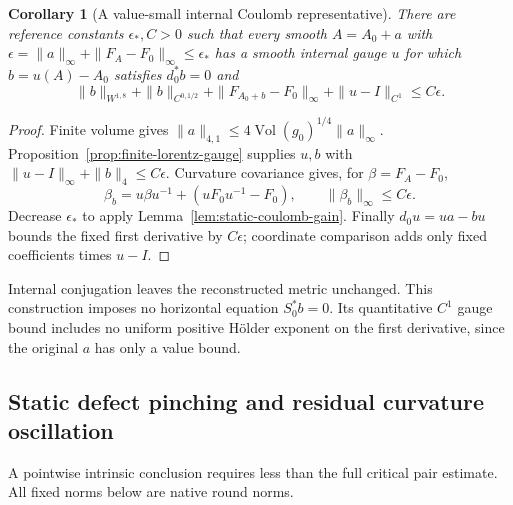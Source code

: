 \documentclass[11pt]{article}
\numberwithin{equation}{section}
\newtheorem{corollary}[theorem]{Corollary}
\theoremstyle{definition}
\theoremstyle{remark}
\begin{document}
\begin{corollary}[A value-small internal Coulomb representative]
\label{cor:value-coulomb-representative}
There are reference constants \(\epsilon_*,C>0\) such that
every smooth \(A=A_0+a\) with
\(\epsilon=\|a\|_\infty+\|F_A-F_0\|_\infty\le\epsilon_*\)
has a smooth internal gauge \(u\) for which
\(b=u(A)-A_0\) satisfies \(d_0^*b=0\) and
\[
 \|b\|_{W^{1,8}}+\|b\|_{C^{0,1/2}}
       +\|F_{A_0+b}-F_0\|_\infty+\|u-I\|_{C^1}
       \le C\epsilon .
\]
\end{corollary}
\begin{proof}
Finite volume gives
\(\|a\|_{4,1}\le4\operatorname{Vol}(g_0)^{1/4}\|a\|_\infty\).
Proposition~\ref{prop:finite-lorentz-gauge} supplies \(u,b\)
with \(\|u-I\|_\infty+\|b\|_4\le C\epsilon\).
Curvature covariance gives, for \(\beta=F_A-F_0\),
\[
 \beta_b=u\beta u^{-1}+(uF_0u^{-1}-F_0),\qquad
                  \|\beta_b\|_\infty\le C\epsilon .
\]
Decrease \(\epsilon_*\) to apply
Lemma~\ref{lem:static-coulomb-gain}.
Finally \(d_0u=u a-bu\) bounds the fixed first derivative
by \(C\epsilon\); coordinate comparison adds only fixed
coefficients times \(u-I\).
\end{proof}

Internal conjugation leaves the reconstructed metric unchanged.
This construction imposes no horizontal equation \(S_0^*b=0\).
Its quantitative \(C^1\) gauge bound includes no uniform
positive H\"older exponent on the first derivative, since
the original \(a\) has only a value bound.


\subsection{Static defect pinching and residual curvature oscillation}
\label{subsec:static-defect-residual}

A pointwise intrinsic conclusion requires less than the full critical
pair estimate. All fixed norms below are native round norms.
\end{document}

